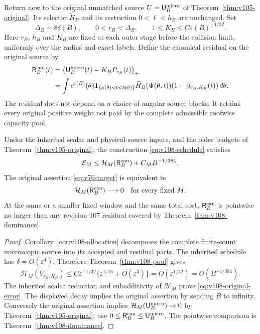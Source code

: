 Return now to the original unmatched source
$U=\mathsf U_B^{\rm micro}$ of Theorem~\ref{thm:v105-original}.
Its selector $\widetilde H_B$ and its restriction $0<\ell<h_B$
are unchanged. Set
\begin{equation}\label{eq:v108-schedule}
 \Delta_B=8\delta(B),\qquad
 0<r_B<\Delta_B,\qquad
 1\le K_B\le C\varepsilon(B)^{-1/32}.
\end{equation}
Here $r_B$, $h_B$ and $K_B$ are fixed at each outer stage before
the collision limit, uniformly over the radius and exact labels.
Define the canonical residual on the original source by
\begin{align}
 \mathsf R_B^{\rm can}(t)
   &=\bigl(\mathsf U_B^{\rm micro}(t)-K_BP_{r_B}(t)\bigr)_+
                                                    \label{eq:v108-residual}\\
   &=\int c^{\varepsilon(B)}(\theta)\mathbf1_{\{a(\theta)<t<b(\theta)\}}
        \widetilde H_B(\Psi(\theta,t))
                   (1-\beta_{r_B,K_B}(t))\,d\theta.\notag
\end{align}
The residual does not depend on a choice of angular source blocks.
It retains every original positive weight not paid by the complete
admissible roofwise capacity pool.

\begin{theorem}
\label{thm:v108-original}
Under the inherited scalar and physical-source inputs, and the
older budgets of Theorem~\ref{thm:v105-original}, the construction
\eqref{eq:v108-schedule} satisfies
\begin{equation}\label{eq:v108-original-error}
 \mathcal E_M\le\mathcal H_M(\mathsf R_B^{\rm can})
                                          +C_MB^{-1/384}.
\end{equation}
The original assertion \eqref{eq:v76-target} is equivalent to
\begin{equation}\label{eq:v108-final-height}
 \mathcal H_M(\mathsf R_B^{\rm can})\longrightarrow0
                         \quad\hbox{for every fixed }M.
\end{equation}
At the same or a smaller fixed window and the same total cost,
$\mathsf R_B^{\rm can}$ is pointwise no larger than any
revision-107 residual covered by Theorem~\ref{thm:v108-dominance}.
\end{theorem}
\begin{proof}
Corollary~\ref{cor:v108-allocation} decomposes the complete
finite-count microscopic source into its accepted and residual
parts. The inherited schedule has $\delta=O(\varepsilon^4)$.
Therefore Theorem~\ref{thm:v108-pool} gives
\[
 \mathcal H_M(V_{r_B,K_B})\le
 C\varepsilon^{-1/32}\{
            \varepsilon^{1/16}+O(\varepsilon^3)\}
       =O(\varepsilon^{1/32})=O(B^{-1/384}).
\]
The inherited scalar reduction and subadditivity of
$\mathcal H_M$ prove \eqref{eq:v108-original-error}.
The displayed decay implies the original assertion by sending
$B$ to infinity. Conversely the original assertion implies
$\mathcal H_M(\mathsf U_B^{\rm micro})\to0$ by
Theorem~\ref{thm:v105-original}; use
$0\le\mathsf R_B^{\rm can}\le\mathsf U_B^{\rm micro}$.
The pointwise comparison is Theorem~\ref{thm:v108-dominance}.
\end{proof}

